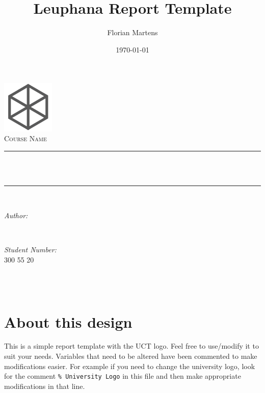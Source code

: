 \documentclass[12pt]{article}
\title{Leuphana Report Template}								%
\author{Florian Martens}								%
\date{\today}											%
\makeatletter
\let\thetitle\@title
\let\theauthor\@author
\let\thedate\@date
\makeatother
\begin{document}
	
	
	\begin{titlepage}
		\centering
		\vspace*{0.5 cm}
		\includegraphics[width=2.5cm]{logo_uni.png} \\[0.5 cm] %
		\textsc{\large Course Name}\\[0.5 cm]				%
		\rule{\linewidth}{0.2 mm} \\[0.4 cm]
		{ \huge \bfseries \thetitle}\\
		\rule{\linewidth}{0.2 mm} \\[1.5 cm]
		
		\begin{minipage}{0.4\textwidth}
			\begin{flushleft} \large
				\emph{Author:}\\
				\theauthor
			\end{flushleft}
		\end{minipage}~
		\begin{minipage}{0.4\textwidth}
			\begin{flushright} \large
				\emph{Student Number:} \\
				300 55 20									%
			\end{flushright}
		\end{minipage}\\[2 cm]
		
		{\large \thedate}\\[2 cm]
		
		\vfill
		
	\end{titlepage}
	
	
	\tableofcontents
	\pagebreak
	
	
	\section{About this design}
	This is a simple report template with the UCT logo. Feel free to use/modify it to suit your needs. Variables that need to be altered have been commented to make modifications easier. For example if you need to change the university logo, look for the comment \texttt{\% University Logo} in this file and then make appropriate modifications in that line.
	
\end{document}
